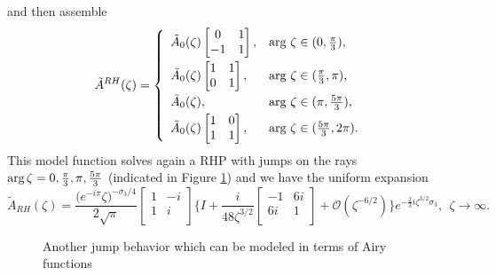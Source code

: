 \documentclass[10pt,oneside,reqno]{amsart}
\numberwithin{equation}{section}
\begin{document}
\begin{appendix}
\begin{equation*}
\end{equation*}
and then assemble
\begin{equation}\label{tildeARH}
	\tilde{A}^{RH}(\zeta) = \left\{
                                 \begin{array}{ll}
                                   \tilde{A}_0(\zeta)\begin{bmatrix}
                                   0 & 1\\
                                   -1 & 1\\
                                   \end{bmatrix}, & \hbox{arg $\zeta\in(0,\frac{\pi}{3})$,} \smallskip\\
                                   \tilde{A}_0(\zeta)\begin{bmatrix}
                          1 & 1 \\
                          0 & 1 \\
                        \end{bmatrix}, & \hbox{arg $\zeta\in(\frac{\pi}{3},\pi)$,} \smallskip \\
                                   \tilde{A}_0(\zeta),& \hbox{arg $\zeta\in(\pi,\frac{5\pi}{3})$,} \smallskip \\
                                   \tilde{A}_0(\zeta)\begin{bmatrix}
                                   1 & 0 \\
                                   1 & 1\\
                                   \end{bmatrix}, & \hbox{arg $\zeta\in(\frac{5\pi}{3},2\pi)$.}
                                 \end{array}
                               \right.
\end{equation}
This model function solves again a RHP with jumps on the rays $\textnormal{arg}\,\zeta=0,\frac{\pi}{3},\pi,\frac{5\pi}{3}$ (indicated in Figure \ref{Airy2}) and we have the uniform
expansion
\begin{equation}\label{tildeARHasy}
		\tilde{A}_{RH}(\zeta)=\frac{\big(e^{-i\pi}\zeta\big)^{-\sigma_3/4}}{2\sqrt{\pi}}\begin{bmatrix}
	1 & -i\\
	1 & i\\
	\end{bmatrix}\Bigg\{I+\frac{i}{48\zeta^{3/2}}\begin{bmatrix}
	-1 & 6i\\
	6i & 1\\
	\end{bmatrix}+\mathcal O\left(\zeta^{-6/2}\right)\Bigg\}
	 e^{-\frac{2}{3}i\zeta^{3/2}\sigma_3},\ \ \zeta\rightarrow\infty.
\end{equation}
\begin{figure}
\begin{center}
\resizebox{0.25\textwidth}{!}{}
\caption{Another jump behavior which can be modeled in terms of Airy functions}
\label{Airy2}
\end{center}
\end{figure}


\end{appendix}
\end{document}
